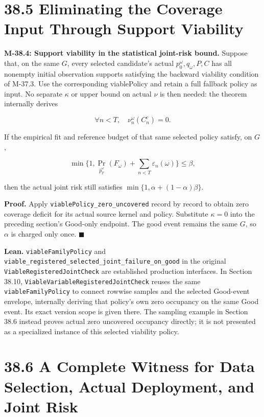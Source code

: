\documentclass[
  english,
  11pt,
  oneside]{book}
\newcounter{none} %
\begin{document}
\section{38.5 Eliminating the Coverage Input Through Support Viability}\label{eliminating-the-coverage-input-through-support-viability}

\hypertarget{m-38-4}{}\label{m-38-4}

\textbf{M-38.4: Support viability in the statistical joint-risk bound.} Suppose that, on the same \(G\), every selected candidate's actual \(p_0^\omega,q_\omega,P,C\) has all nonempty initial observation supports satisfying the backward viability condition of M-37.3. Use the corresponding viablePolicy and retain a full fallback policy as input. No separate \(\kappa\) or upper bound on actual \(\nu\) is then needed: the theorem internally derives

\[\forall n<T,\quad \nu_n^\omega(C_n^c)=0.\]

If the empirical fit and reference budget of that same selected policy satisfy, on \(G\),

\[\min\{1,\Pr_{\widehat p_T^\omega}(F_\omega)
+\sum_{n<T}\varepsilon_n(\omega)\}\le\beta,\]

then the actual joint risk still satisfies \(\min\{1,\alpha+(1-\alpha)\beta\}\).

\textbf{Proof.} Apply \nolinkurl{viablePolicy_zero_uncovered} record by record to obtain zero coverage deficit for its actual source kernel and policy. Substitute \(\kappa=0\) into the preceding section's Good-only endpoint. The good event remains the same \(G\), so \(\alpha\) is charged only once. \(\blacksquare\)

\textbf{Lean.} \nolinkurl{viableFamilyPolicy} and \nolinkurl{viable_registered_selected_joint_failure_on_good} in the original \nolinkurl{ViableRegisteredJointCheck} are established production interfaces. In Section 38.10, \nolinkurl{ViableVariableRegisteredJointCheck} reuses the same \nolinkurl{viableFamilyPolicy} to connect rowwise samples and the selected Good-event envelope, internally deriving that policy's own zero occupancy on the same Good event. Its exact version scope is given there. The sampling example in Section 38.6 instead proves actual zero uncovered occupancy directly; it is not presented as a specialized instance of this selected viability policy.

\section{38.6 A Complete Witness for Data Selection, Actual Deployment, and Joint Risk}\label{a-complete-witness-for-data-selection-actual-deployment-and-joint-risk}
\end{document}
